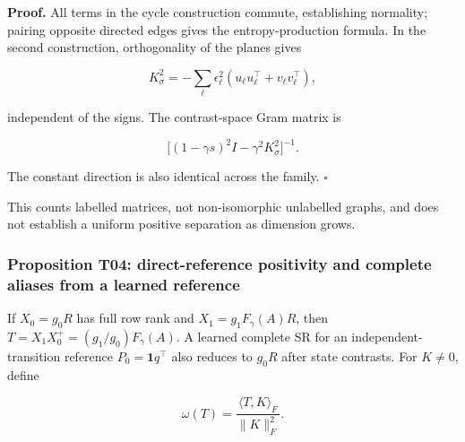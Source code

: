 \documentclass[11pt,a4paper]{article}
\begin{document}
\par
\noindent\begin{minipage}{\linewidth}

\textbf{Proof.} All terms in the cycle construction commute,
establishing normality; pairing opposite directed edges gives the
entropy-production formula. In the second construction, orthogonality of
the planes gives

\[
K_\sigma^2=-\sum_\ell\epsilon_\ell^2
(u_\ell u_\ell^\top+v_\ell v_\ell^\top),
\]

\end{minipage}\par

\par
\noindent\begin{minipage}{\linewidth}

independent of the signs. The contrast-space Gram matrix is

\[
\big[(1-\gamma s)^2I-\gamma^2K_\sigma^2\big]^{-1}.
\]

\end{minipage}\par

The constant direction is also identical across the family. \(\square\)

This counts labelled matrices, not non-isomorphic unlabelled graphs, and
does not establish a uniform positive separation as dimension grows.

\subsubsection{Proposition T04: direct-reference positivity and complete
aliases from a learned
reference}\label{proposition-t04-direct-reference-positivity-and-complete-aliases-from-a-learned-reference}

\par
\noindent\begin{minipage}{\linewidth}

If \(X_0=g_0R\) has full row rank and \(X_1=g_1F_\gamma(A)R\), then
\(T=X_1X_0^+=(g_1/g_0)F_\gamma(A)\). A learned complete SR for an
independent-transition reference \(P_0=\mathbf1q^\top\) also reduces to
\(g_0R\) after state contrasts. For \(K\ne0\), define

\[
\omega(T)=\frac{\langle T,K\rangle_F}{\|K\|_F^2}.
\]

\end{minipage}\par
\end{document}
